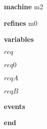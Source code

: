 \begin{block}
  \item   \textbf{machine} m2
  \item   \textbf{refines} m0
  \item   \textbf{variables}
  \begin{block}
    \item   $req$
    \item   $req0$
    \item   $reqA$
    \item   $reqB$
  \end{block}
  \item   
  \item   \textbf{events}
  \begin{block}
    \item   
    \item   
  \end{block}
  \item   \textbf{end} \\
\end{block}
